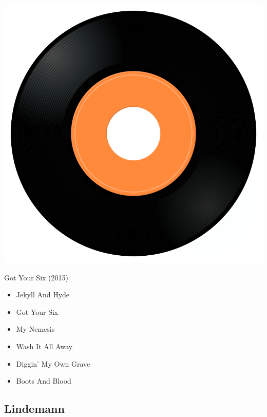 \begin{minipage}[t]{0.25\textwidth}
\captionsetup{type=figure}
\includegraphics[width=\textwidth]{Images/cover.png}
\caption*{Got Your Six (2015)}
\end{minipage}
\begin{minipage}[t]{0.25\textwidth}\vspace{0pt}
\begin{itemize}[nosep,leftmargin=1em,labelwidth=*,align=left]
	\setlength{\itemsep}{0pt}
	\item Jekyll And Hyde
	\item Got Your Six
	\item My Nemesis
	\item Wash It All Away
	\item Diggin' My Own Grave
	\item Boots And Blood
\end{itemize}
\end{minipage}

\subsection{Lindemann}

